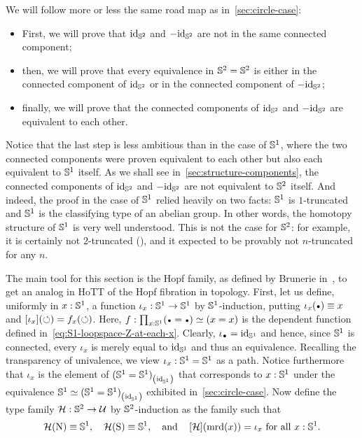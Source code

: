 \documentclass[english,a4paper]{lmcs}
\begin{document}
We will follow more or less the same road map as
in~\cref{sec:circle-case}:
\begin{itemize}
\item First, we will prove that $\mathord{\mathrm{id}}_{{\mathbb S^{2}}}$ and $-\mathord{\mathrm{id}}_{{\mathbb S^{2}}}$ are not in
  the same connected component;
\item then, we will prove that every equivalence in ${{\mathbb S^{2}}}={{\mathbb S^{2}}}$ is
  either in the connected component of $\mathord{\mathrm{id}}_{{\mathbb S^{2}}}$ or in the connected
  component of $-\mathord{\mathrm{id}}_{{\mathbb S^{2}}}$;
\item finally, we will prove that the connected components of $\mathord{\mathrm{id}}_{{\mathbb S^{2}}}$
  and $-\mathord{\mathrm{id}}_{{\mathbb S^{2}}}$ are equivalent to each other.
\end{itemize}
Notice that the last step is less ambitious than in the case of ${{\mathbb S^{1}}}$,
where the two connected components were proven equivalent to each
other but also each equivalent to ${{\mathbb S^{1}}}$ itself.
As we shall see in~\cref{sec:structure-components}, the connected
components of $\mathord{\mathrm{id}}_{{\mathbb S^{2}}}$ and $-\mathord{\mathrm{id}}_{{\mathbb S^{2}}}$ are not equivalent to ${{\mathbb S^{2}}}$
itself.
And indeed, the proof in the case of ${{\mathbb S^{1}}}$ relied heavily on two
facts: ${{\mathbb S^{1}}}$ is $1$-truncated and ${{\mathbb S^{1}}}$ is the classifying type of an
abelian group. In other words, the homotopy structure of ${{\mathbb S^{1}}}$ is very
well understood. This is not the case for ${{\mathbb S^{2}}}$: for example, it is
certainly not $2$-truncated (\cite{brunerie:thesis}), and it expected
to be provably not $n$-truncated for any $n$.

The main tool for this section is the Hopf family, as defined by Brunerie
in~\cite{brunerie:thesis}, to get an analog in HoTT of the Hopf
fibration in topology. First, let us define, uniformly in $x:{{\mathbb S^{1}}}$, a
function $\iota_x: {{\mathbb S^{1}}}\to{{\mathbb S^{1}}}$ by ${{\mathbb S^{1}}}$-induction, putting
$\iota_x(\base) \jdeq x$ and $\mathop{\left[{\iota_x}\right]}(\mathord{\circlearrowleft}) = f_x(\mathord{\circlearrowleft})$.
Here, $f\from \prod_{x\from\Sc} (\base=\base) \weq (x=x)$ is the
dependent function defined in~\cref{eq:S1-loopspace-Z-at-each-x}.
Clearly, $\iota_{\base}=\id_{\Sc}$ and hence, since ${{\mathbb S^{1}}}$ is connected,
every $\iota_x$ is merely equal to $\mathord{\mathrm{id}}_{{{\mathbb S^{1}}}}$ and thus an equivalence.
Recalling the transparency of univalence,
we view $\iota_x: {{\mathbb S^{1}}}={{\mathbb S^{1}}}$ as a path.
Notice furthermore that $\iota_x$ is the element
of ${({{\mathbb S^{1}}}={{\mathbb S^{1}}})}_{\left(\mathord{\mathrm{id}}_{{\mathbb S^{1}}}\right)}$ that corresponds to $x:{{\mathbb S^{1}}}$
under the equivalence ${{\mathbb S^{1}}} \simeq {({{\mathbb S^{1}}}={{\mathbb S^{1}}})}_{\left(\mathord{\mathrm{id}}_{{\mathbb S^{1}}}\right)}$
exhibited in~\cref{sec:circle-case}. Now define the type family
${\mathcal H}: {{\mathbb S^{2}}} \to \mathcal{U}$ by ${{\mathbb S^{2}}}$-induction as the family such that
\begin{displaymath}
  {\mathcal H}(\mathrm{N}) \equiv {{\mathbb S^{1}}},\quad
  {\mathcal H}(\mathrm{S}) \equiv {{\mathbb S^{1}}},\quad\text{and}\quad
  \mathop{\left[{{\mathcal H}}\right]} (\operatorname{\mathrm{mrd}}(x)) = \iota_x\ \text{for all}\ x:{{\mathbb S^{1}}}.
\end{displaymath}
\end{document}
